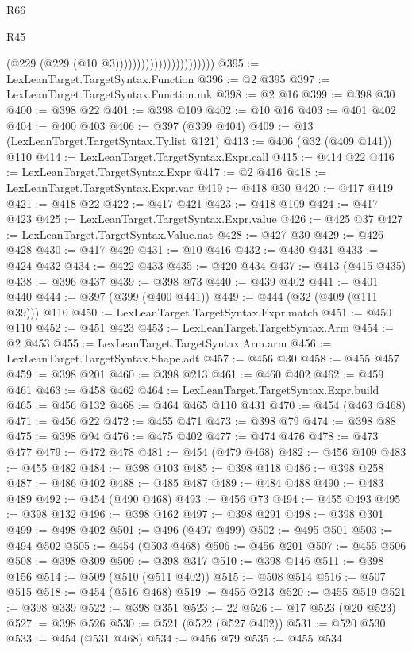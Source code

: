 \begin{lexlean}{R66}
\begin{lexlean}{R45}
\begin{coremodule}
{{{{{{{{{{{{{{{{{{{{{{{{{{{{{{{{{{{{{{{{{{{{{{{{{{{{{{{{{{{{{{{{{{{{{{{{{{{{{{{{{{{{{{{{{{{                                            (@229 (@229 (@10 @3)))))))))))))))))))))))
@395 := LexLeanTarget.TargetSyntax.Function
@396 := @2 @395
@397 := LexLeanTarget.TargetSyntax.Function.mk
@398 := @2 @16
@399 := @398 @30
@400 := @398 @22
@401 := @398 @109
@402 := @10 @16
@403 := @401 @402
@404 := @400 @403
@406 := @397 (@399 @404)
@409 := @13 (LexLeanTarget.TargetSyntax.Ty.list @121)
@413 := @406 (@32 (@409 @141)) @110
@414 := LexLeanTarget.TargetSyntax.Expr.call
@415 := @414 @22
@416 := LexLeanTarget.TargetSyntax.Expr
@417 := @2 @416
@418 := LexLeanTarget.TargetSyntax.Expr.var
@419 := @418 @30
@420 := @417 @419
@421 := @418 @22
@422 := @417 @421
@423 := @418 @109
@424 := @417 @423
@425 := LexLeanTarget.TargetSyntax.Expr.value
@426 := @425 @37
@427 := LexLeanTarget.TargetSyntax.Value.nat
@428 := @427 @30
@429 := @426 @428
@430 := @417 @429
@431 := @10 @416
@432 := @430 @431
@433 := @424 @432
@434 := @422 @433
@435 := @420 @434
@437 := @413 (@415 @435)
@438 := @396 @437
@439 := @398 @73
@440 := @439 @402
@441 := @401 @440
@444 := @397 (@399 (@400 @441))
@449 := @444 (@32 (@409 (@111 @39))) @110
@450 := LexLeanTarget.TargetSyntax.Expr.match
@451 := @450 @110
@452 := @451 @423
@453 := LexLeanTarget.TargetSyntax.Arm
@454 := @2 @453
@455 := LexLeanTarget.TargetSyntax.Arm.arm
@456 := LexLeanTarget.TargetSyntax.Shape.adt
@457 := @456 @30
@458 := @455 @457
@459 := @398 @201
@460 := @398 @213
@461 := @460 @402
@462 := @459 @461
@463 := @458 @462
@464 := LexLeanTarget.TargetSyntax.Expr.build
@465 := @456 @132
@468 := @464 @465 @110 @431
@470 := @454 (@463 @468)
@471 := @456 @22
@472 := @455 @471
@473 := @398 @79
@474 := @398 @88
@475 := @398 @94
@476 := @475 @402
@477 := @474 @476
@478 := @473 @477
@479 := @472 @478
@481 := @454 (@479 @468)
@482 := @456 @109
@483 := @455 @482
@484 := @398 @103
@485 := @398 @118
@486 := @398 @258
@487 := @486 @402
@488 := @485 @487
@489 := @484 @488
@490 := @483 @489
@492 := @454 (@490 @468)
@493 := @456 @73
@494 := @455 @493
@495 := @398 @132
@496 := @398 @162
@497 := @398 @291
@498 := @398 @301
@499 := @498 @402
@501 := @496 (@497 @499)
@502 := @495 @501
@503 := @494 @502
@505 := @454 (@503 @468)
@506 := @456 @201
@507 := @455 @506
@508 := @398 @309
@509 := @398 @317
@510 := @398 @146
@511 := @398 @156
@514 := @509 (@510 (@511 @402))
@515 := @508 @514
@516 := @507 @515
@518 := @454 (@516 @468)
@519 := @456 @213
@520 := @455 @519
@521 := @398 @339
@522 := @398 @351
@523 := 22
@526 := @17 @523 (@20 @523)
@527 := @398 @526
@530 := @521 (@522 (@527 @402))
@531 := @520 @530
@533 := @454 (@531 @468)
@534 := @456 @79
@535 := @455 @534
}}}}}}}}}}}}}}}}}}}}}}}}}}}}}}}}}}}}}}}}}}}}}}}}}}}}}}}}}}}}}}}}}}}}}}}}}}}}}}}}}}}}}}}}}}}
\end{coremodule}
\end{lexlean}
\end{lexlean}
